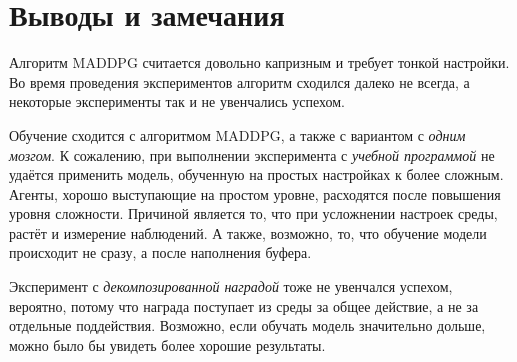 





\section{Выводы и замечания}

Алгоритм MADDPG считается довольно капризным и требует тонкой настройки. Во время проведения экспериментов алгоритм сходился далеко не всегда, а некоторые эксперименты так и не увенчались успехом.

Обучение сходится с алгоритмом MADDPG, а также с вариантом с \textit{одним мозгом}. К сожалению, при выполнении эксперимента с \textit{учебной программой} не удаётся применить модель, обученную на простых настройках к более сложным. Агенты, хорошо выступающие на простом уровне, расходятся после повышения уровня сложности. Причиной является то, что при усложнении настроек среды, растёт и измерение наблюдений. А также, возможно, то, что обучение модели происходит не сразу, а после наполнения буфера.

Эксперимент с \textit{декомпозированной наградой} тоже не увенчался успехом, вероятно, потому что награда поступает из среды за общее действие, а не за отдельные поддействия. Возможно, если обучать модель значительно дольше, можно было бы увидеть более хорошие результаты.


\newpage
